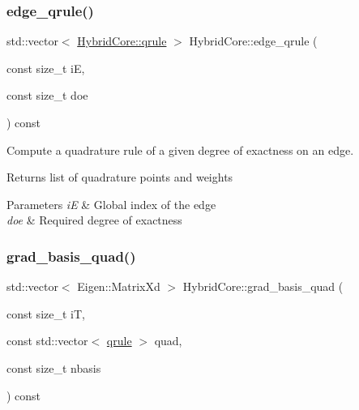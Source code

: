 \subsubsection{\texorpdfstring{edge\+\_\+qrule()}{edge\_qrule()}}
{\footnotesize\ttfamily std\+::vector$<$ \hyperlink{structHArDCore2D_1_1HybridCore_1_1qrule}{Hybrid\+Core\+::qrule} $>$ Hybrid\+Core\+::edge\+\_\+qrule (\begin{DoxyParamCaption}\item[{const size\+\_\+t}]{iE,  }\item[{const size\+\_\+t}]{doe }\end{DoxyParamCaption}) const}



Compute a quadrature rule of a given degree of exactness on an edge. 

\begin{DoxyReturn}{Returns}
list of quadrature points and weights 
\end{DoxyReturn}

\begin{DoxyParams}{Parameters}
{\em iE} & Global index of the edge \\
\hline
{\em doe} & Required degree of exactness \\
\hline
\end{DoxyParams}
\mbox{\label{classHArDCore2D_1_1HybridCore_a14adb4f4cfdd2dc7f9be9bfd085e7d87}} 
\subsubsection{\texorpdfstring{grad\+\_\+basis\+\_\+quad()}{grad\_basis\_quad()}}
{\footnotesize\ttfamily std\+::vector$<$ Eigen\+::\+Matrix\+Xd $>$ Hybrid\+Core\+::grad\+\_\+basis\+\_\+quad (\begin{DoxyParamCaption}\item[{const size\+\_\+t}]{iT,  }\item[{const std\+::vector$<$ \hyperlink{structHArDCore2D_1_1HybridCore_1_1qrule}{qrule} $>$}]{quad,  }\item[{const size\+\_\+t}]{nbasis }\end{DoxyParamCaption}) const}



